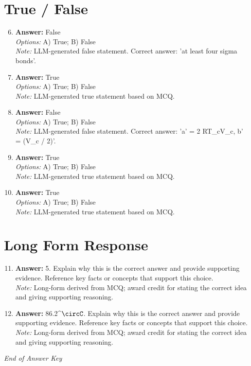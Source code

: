 \documentclass[12pt]{article}
\begin{document}
\section*{True / False}
\begin{enumerate}[label=\arabic*.]
\setcounter{enumi}{5}
\item \textbf{Answer:} False
\\ \textit{Options:} A) True; B) False
\\ \textit{Note:} LLM-generated false statement. Correct answer: 'at least four sigma bonds'.
\item \textbf{Answer:} True
\\ \textit{Options:} A) True; B) False
\\ \textit{Note:} LLM-generated true statement based on MCQ.
\item \textbf{Answer:} False
\\ \textit{Options:} A) True; B) False
\\ \textit{Note:} LLM-generated false statement. Correct answer: 'a' = 2 RT\_cV\_c, b' = (V\_c / 2)'.
\item \textbf{Answer:} True
\\ \textit{Options:} A) True; B) False
\\ \textit{Note:} LLM-generated true statement based on MCQ.
\item \textbf{Answer:} True
\\ \textit{Options:} A) True; B) False
\\ \textit{Note:} LLM-generated true statement based on MCQ.
\end{enumerate}

\section*{Long Form Response}
\begin{enumerate}[label=\arabic*.]
\setcounter{enumi}{10}
\item \textbf{Answer:} 5. Explain why this is the correct answer and provide supporting evidence. Reference key facts or concepts that support this choice.
\\ \textit{Note:} Long-form derived from MCQ; award credit for stating the correct idea and giving supporting reasoning.
\item \textbf{Answer:} 86.2^\ensuremath{\circC}. Explain why this is the correct answer and provide supporting evidence. Reference key facts or concepts that support this choice.
\\ \textit{Note:} Long-form derived from MCQ; award credit for stating the correct idea and giving supporting reasoning.
\end{enumerate}

\vfill
\noindent\textit{End of Answer Key}
\end{document}
